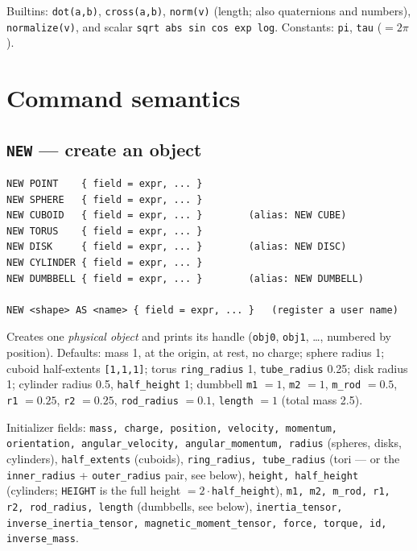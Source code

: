 \documentclass[11pt]{article}
\newcommand{\kw}[1]{\texttt{\uppercase{#1}}}
\newcommand{\code}[1]{\texttt{#1}}
\begin{document}
Builtins: \code{dot(a,b)}, \code{cross(a,b)}, \code{norm(v)} (length;
also quaternions and numbers), \code{normalize(v)}, and scalar
\code{sqrt abs sin cos exp log}. Constants: \code{pi}, \code{tau}
($=2\pi$).

\section{Command semantics}

\subsection{\kw{new} --- create an object}\label{sec:new}

\begin{lstlisting}
NEW POINT    { field = expr, ... }
NEW SPHERE   { field = expr, ... }
NEW CUBOID   { field = expr, ... }        (alias: NEW CUBE)
NEW TORUS    { field = expr, ... }
NEW DISK     { field = expr, ... }        (alias: NEW DISC)
NEW CYLINDER { field = expr, ... }
NEW DUMBBELL { field = expr, ... }        (alias: NEW DUMBELL)

NEW <shape> AS <name> { field = expr, ... }   (register a user name)
\end{lstlisting}

Creates one \emph{physical object} and prints its handle (\code{obj0},
\code{obj1}, \ldots, numbered by position). Defaults: mass 1, at the
origin, at rest, no charge; sphere radius 1; cuboid half-extents
\code{[1,1,1]}; torus \code{ring\_radius} 1, \code{tube\_radius} 0.25;
disk radius 1; cylinder radius 0.5, \code{half\_height} 1; dumbbell
\code{m1} $= 1$, \code{m2} $= 1$, \code{m\_rod} $= 0.5$, \code{r1}
$= 0.25$, \code{r2} $= 0.25$, \code{rod\_radius} $= 0.1$,
\code{length} $= 1$ (total mass 2.5).

Initializer fields: \code{mass, charge, position, velocity, momentum,
orientation, angular\_velocity, angular\_momentum, radius} (spheres,
disks, cylinders), \code{half\_extents} (cuboids), \code{ring\_radius,
tube\_radius} (tori --- or the \code{inner\_radius} +
\code{outer\_radius} pair, see below), \code{height, half\_height}
(cylinders; \kw{height} is the full height $= 2\cdot$\code{half\_height}),
\code{m1, m2, m\_rod, r1, r2, rod\_radius, length} (dumbbells, see
below), \code{inertia\_tensor, inverse\_inertia\_tensor,
magnetic\_moment\_tensor, force, torque, id, inverse\_mass}.
\end{document}
